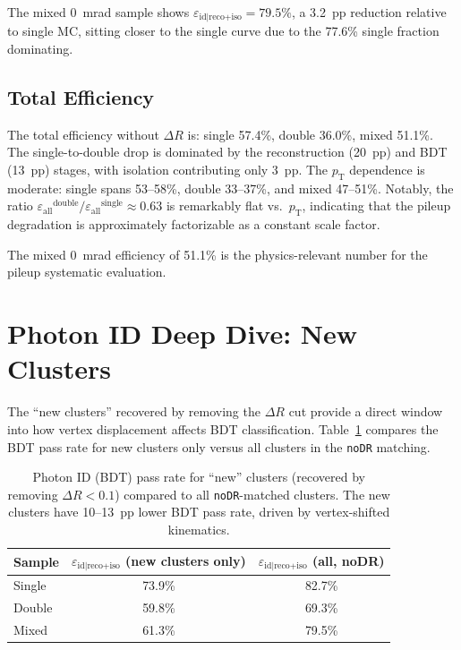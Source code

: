 \documentclass[11pt,letterpaper]{article}
\newcommand{\DR}{\ensuremath{\Delta R}}
\newcommand{\pT}{\ensuremath{p_{\text{T}}}}
\newcommand{\eid}{\ensuremath{\varepsilon_{\text{id}|\text{reco+iso}}}}
\newcommand{\eall}{\ensuremath{\varepsilon_{\text{all}}}}
\begin{document}
The mixed 0~mrad sample shows $\eid = 79.5\%$, a 3.2~pp reduction relative
to single MC, sitting closer to the single curve due to the 77.6\% single
fraction dominating.

\subsection{Total Efficiency}

The total efficiency without $\DR$ is: single 57.4\%, double 36.0\%, mixed
51.1\%. The single-to-double drop is dominated by the reconstruction (20~pp)
and BDT (13~pp) stages, with isolation contributing only 3~pp. The
\pT{} dependence is moderate: single spans 53--58\%, double 33--37\%, and
mixed 47--51\%. Notably, the ratio $\eall^\text{double} / \eall^\text{single}
\approx 0.63$ is remarkably flat vs.\ \pT, indicating that the pileup
degradation is approximately factorizable as a constant scale factor.

The mixed 0~mrad efficiency of 51.1\% is the physics-relevant number for the
pileup systematic evaluation.


\section{Photon ID Deep Dive: New Clusters}
\label{sec:newclusters}

The ``new clusters'' recovered by removing the $\DR$ cut provide a direct
window into how vertex displacement affects BDT classification.
Table~\ref{tab:newclusters} compares the BDT pass rate for new clusters only
versus all clusters in the \texttt{noDR} matching.

\begin{table}[htbp]
\centering
\caption{Photon ID (BDT) pass rate for ``new'' clusters (recovered by
  removing $\DR < 0.1$) compared to all \texttt{noDR}-matched clusters.
  The new clusters have 10--13~pp lower BDT pass rate, driven by
  vertex-shifted kinematics.}
\label{tab:newclusters}
\begin{tabular}{lcc}
\toprule
\textbf{Sample} & $\eid$ (new clusters only) & $\eid$ (all, noDR) \\
\midrule
Single & 73.9\% & 82.7\% \\
Double & 59.8\% & 69.3\% \\
Mixed  & 61.3\% & 79.5\% \\
\bottomrule
\end{tabular}
\end{table}
\end{document}

